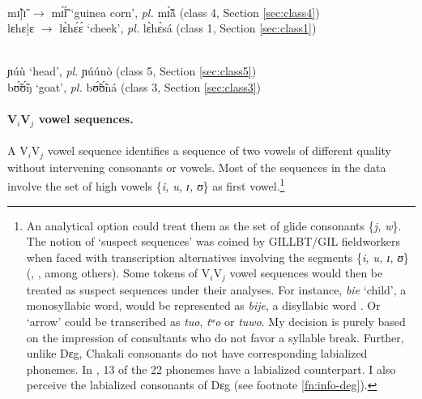 \begin{exe}
\ex\label{ex:V1V1vowel-seq}
\begin{xlist}

\ex  {\rm V$_{i}$]-V$_{i}$: a morpheme boundary intervenes} \\
 mɪ̃]ɪ̃ $\rightarrow$ mɪ̃́ɪ̃́  {\rm `guinea corn'}, {\it pl.} mɪ̃́ã́  {\rm 
 ({\sc class 4}, Section \ref{sec:class4})} \\
  lɛhɛ]ɛ  $\rightarrow$  lɛ̀hɛ́ɛ́  {\rm `cheek'},  {\it pl.}   lɛ̀hɛ̀sá  
{\rm ({\sc class 1},  Section \ref{sec:class1})}


 \\
ɲúù {\rm  `head'}, {\it pl.} ɲúúnò {\rm  ({\sc class 5}, Section 
\ref{sec:class5})}\\	
bʊ̃́ʊ̃́ŋ	 {\rm  `goat'}, {\it pl.} bʊ̃́ʊ̃́ná  
{\rm  ({\sc class 3}, Section \ref{sec:class3})}
\end{xlist}
\end{exe}






\paragraph{V$_{i}$V$_{j}$ vowel sequences.}
\label{sec:V1V2vowel-seq}

A V$_{i}$V$_{j}$ vowel sequence identifies a sequence of two vowels of different 
quality without intervening consonants or vowels. Most of the sequences in the 
data involve  the set of high vowels \{{\it i, u, ɪ, ʊ}\}  as first 
vowel.\footnote{\label{fn:deg-labial} An analytical option could treat them as 
the set of glide consonants \{{\it j, w}\}.  The notion of  `suspect sequences' 
was coined by GILLBT/GIL fieldworkers when faced with  transcription 
alternatives involving the segments  \{{\it i, u, ɪ, ʊ}\} (\cite[4]{Gray69}, 
\citealt[8]{Toup95}, among others).  Some  tokens of V$_{i}$V$_{j}$ vowel 
sequences  would then be treated as suspect sequences under their analyses. For 
instance, {\it bie} `child', a monosyllabic word,  would be represented as {\it 
bije}, a disyllabic word \citep[see also][100]{Kedr97}. Or `arrow' could be 
transcribed as {\it tuo}, {\it tʷo} or {\it tuwo}.  My decision is purely based 
on the impression of  consultants who do not favor a syllable break.  Further, 
unlike  Dɛg, Chakali consonants do not have corresponding  labialized  phonemes. 
In \citet[2]{Crou03},  13 of the 22 phonemes have a labialized 
counterpart. I also perceive the labialized consonants of Dɛg (see footnote 
\ref{fn:info-deg}).}

